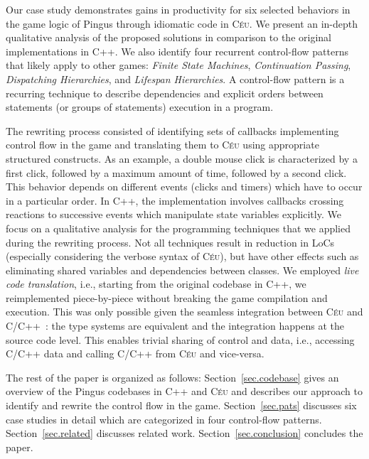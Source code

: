 \documentclass{vgtc}                          %
\newcommand{\CEU}{\textsc{C\'{e}u}\xspace}
\begin{document}
Our case study demonstrates gains in productivity for six selected behaviors in
the game logic of Pingus through idiomatic code in \CEU.
We present an in-depth qualitative analysis of the proposed solutions in
comparison to the original implementations in C++.
We also identify four recurrent control-flow patterns that likely apply to
other games:
        \emph{Finite State Machines},
        \emph{Continuation Passing},
        \emph{Dispatching Hierarchies}, and
        \emph{Lifespan Hierarchies}.
%
A control-flow pattern is a recurring technique to describe dependencies and
explicit orders between statements (or groups of statements) execution in a
program.

The rewriting process consisted of identifying sets of callbacks implementing
control flow in the game and translating them to \CEU using appropriate
structured constructs.
%
As an example, a double mouse click is characterized by a first click, followed
by a maximum amount of time, followed by a second click.
This behavior depends on different events (clicks and timers) which have to
occur in a particular order.
In C++, the implementation involves callbacks crossing reactions to successive
events which manipulate state variables explicitly.
%
We focus on a qualitative analysis for the programming techniques that we
applied during the rewriting process.
Not all techniques result in reduction in LoCs (especially considering the
verbose syntax of \CEU), but have other effects such as eliminating shared
variables and dependencies between classes.
%
We employed \emph{live code translation}, i.e., starting from the original
codebase in C++, we reimplemented piece-by-piece without breaking the game
compilation and execution.
%
This was only possible given the seamless integration between \CEU and
C/C++~\cite{ceu.sensys13}: the type systems are equivalent and the integration
happens at the source code level.
This enables trivial sharing of control and data, i.e., accessing C/C++ data
and calling C/C++ from \CEU and vice-versa.

The rest of the paper is organized as follows:
Section~\ref{sec.codebase} gives an overview of the Pingus codebases in C++ and
\CEU and describes our approach to identify and rewrite the control flow in the
game.
Section~\ref{sec.pats} discusses six case studies in detail which are
categorized in four control-flow patterns.
Section~\ref{sec.related} discusses related work.
Section~\ref{sec.conclusion} concludes the paper.
\end{document}
